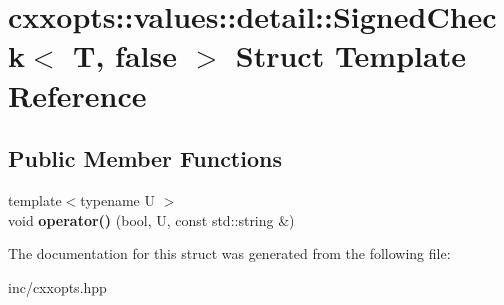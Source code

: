 \hypertarget{structcxxopts_1_1values_1_1detail_1_1SignedCheck_3_01T_00_01false_01_4}{}\section{cxxopts\+:\+:values\+:\+:detail\+:\+:Signed\+Check$<$ T, false $>$ Struct Template Reference}
\label{structcxxopts_1_1values_1_1detail_1_1SignedCheck_3_01T_00_01false_01_4}
\subsection*{Public Member Functions}
\begin{DoxyCompactItemize}
\item 
{\footnotesize template$<$typename U $>$ }\\void {\bfseries operator()} (bool, U, const std\+::string \&)\hypertarget{structcxxopts_1_1values_1_1detail_1_1SignedCheck_3_01T_00_01false_01_4_a616bc4801ac0d3cd851ec3ac4fad9bce}{}\label{structcxxopts_1_1values_1_1detail_1_1SignedCheck_3_01T_00_01false_01_4_a616bc4801ac0d3cd851ec3ac4fad9bce}

\end{DoxyCompactItemize}


The documentation for this struct was generated from the following file\+:\begin{DoxyCompactItemize}
\item 
inc/cxxopts.\+hpp\end{DoxyCompactItemize}
